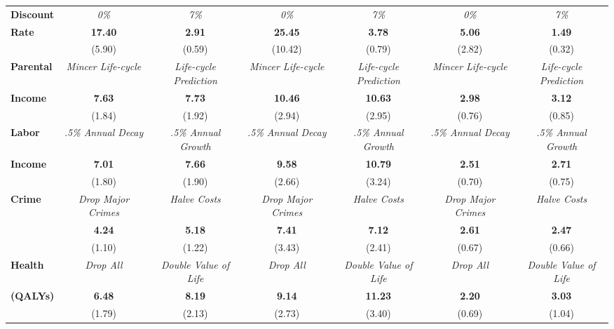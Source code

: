 \begin{tabular}{>{\bfseries}lcc|cc|cc}
Discount 	&	\textit{0\%}	&	\textit{7\%}	&	\textit{0\%}	&	\textit{7\%}	&	\textit{0\%}	&	\textit{7\%}	\\
Rate	&	\textbf{17.40}	&	\textbf{2.91}	&	\textbf{25.45}	&	\textbf{3.78}	&	\textbf{5.06}	&	\textbf{1.49}	\\
	&	(5.90)	&	(0.59)	&	(10.42)	&	(0.79)	&	(2.82)	&	(0.32)	\\ \midrule
Parental	&	\textit{Mincer Life-cycle}	&	\textit{Life-cycle Prediction}	&	\textit{Mincer Life-cycle}	&	\textit{Life-cycle Prediction}	&	\textit{Mincer Life-cycle}	&	\textit{Life-cycle Prediction}	\\
Income	&	\textbf{7.63}	&	\textbf{7.73}	&	\textbf{10.46}	&	\textbf{10.63}	&	\textbf{2.98}	&	\textbf{3.12}	\\
	&	(1.84)	&	(1.92)	&	(2.94)	&	(2.95)	&	(0.76)	&	(0.85)	\\ \midrule
Labor	&	\textit{.5\% Annual Decay}	&	\textit{.5\% Annual Growth}	&	\textit{.5\% Annual Decay}	&	\textit{.5\% Annual Growth}	&	\textit{.5\% Annual Decay}	&	\textit{.5\% Annual Growth}	\\
Income	&	\textbf{7.01}	&	\textbf{7.66}	&	\textbf{9.58}	&	\textbf{10.79}	&	\textbf{2.51}	&	\textbf{2.71}	\\
	&	(1.80)	&	(1.90)	&	(2.66)	&	(3.24)	&	(0.70)	&	(0.75)	\\ \midrule
Crime	&	\textit{Drop Major Crimes}	&	\textit{Halve Costs}	&	\textit{Drop Major Crimes}	&	\textit{Halve Costs}	&	\textit{Drop Major Crimes}	&	\textit{Halve Costs}	\\
	&	\textbf{4.24}	&	\textbf{5.18}	&	\textbf{7.41}	&	\textbf{7.12}	&	\textbf{2.61}	&	\textbf{2.47}	\\
	&	(1.10)	&	(1.22)	&	(3.43)	&	(2.41)	&	(0.67)	&	(0.66)	\\ \midrule
Health	&	\textit{Drop All}	&	\textit{Double Value of Life}	&	\textit{Drop All}	&	\textit{Double Value of Life}	&	\textit{Drop All}	&	\textit{Double Value of Life}	\\
(QALYs)	&	\textbf{6.48}	&	\textbf{8.19}	&	\textbf{9.14}	&	\textbf{11.23}	&	\textbf{2.20}	&	\textbf{3.03}	\\
	&	(1.79)	&	(2.13)	&	(2.73)	&	(3.40)	&	(0.69)	&	(1.04)	\\ \bottomrule
\end{tabular} 